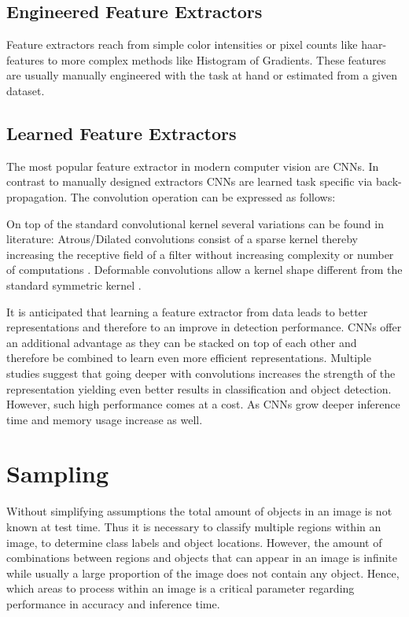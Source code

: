 	\subsection{Engineered Feature Extractors}
	
	Feature extractors reach from simple color intensities or pixel counts like haar-features \cite{Viola2004} to more complex methods like Histogram of Gradients\cite{Forsyth}. These features are usually manually engineered with the task at hand or estimated from a given dataset.
	
	\subsection{Learned Feature Extractors}
	
	The most popular feature extractor in modern computer vision are \acp{CNN}. In contrast to manually designed extractors \acp{CNN} are learned task specific via back-propagation. The convolution operation can be expressed as follows:
	
	On top of the standard convolutional kernel several variations can be found in literature: Atrous/Dilated convolutions consist of a sparse kernel thereby increasing the receptive field of a filter without increasing complexity or number of computations . Deformable convolutions allow a kernel shape different from the standard symmetric kernel .
	
	It is anticipated that learning a feature extractor from data leads to better representations and therefore to an improve in detection performance. \acp{CNN} offer an additional advantage as they can be stacked on top of each other and therefore be combined to learn even more efficient representations. Multiple studies suggest that going deeper with convolutions increases the strength of the representation yielding even better results in classification and object detection. However, such high performance comes at a cost. As \acp{CNN} grow deeper inference time and memory usage increase as well.
	
	\section{Sampling}
	
	Without simplifying assumptions the total amount of objects in an image is not known at test time. Thus it is necessary to classify multiple regions within an image, to determine class labels and object locations. However, the amount of combinations between regions and objects that can appear in an image is infinite while usually a large proportion of the image does not contain any object. Hence, which areas to process within an image is a critical parameter regarding performance in accuracy and inference time.
	

